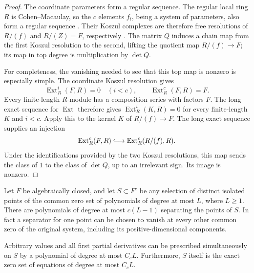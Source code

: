 \begin{proof}
The coordinate parameters form a regular sequence.  The regular local
ring $R$ is Cohen--Macaulay, so the $c$ elements $f_i$, being a system of
parameters, also form a regular sequence
\cite[Tags~00OQ, 00NQ, and 02JN]{stacksproject}.  Their Koszul complexes
are therefore free resolutions of $R/(f)$ and $R/(Z)=F$, respectively
\cite[Tag~062F]{stacksproject}.
The matrix $Q$ induces a chain map from the first Koszul resolution to
the second, lifting the quotient map $R/(f)\longrightarrow F$; its map
in top degree is multiplication by $\det Q$.

For completeness, the vanishing needed to see that this top map is
nonzero is especially simple.  The coordinate Koszul resolution gives
\[
 \operatorname{Ext}^i_R(F,R)=0\quad(i<c),\qquad
 \operatorname{Ext}^c_R(F,R)=F.
\]
Every finite-length $R$-module has a composition series with factors
$F$.  The long exact sequence for $\operatorname{Ext}$ therefore gives
$\operatorname{Ext}^i_R(K,R)=0$ for every finite-length $K$ and $i<c$.
Apply this to the kernel $K$ of $R/(f)\longrightarrow F$.  The long exact
sequence supplies an injection
\[
 \operatorname{Ext}^c_R(F,R)\lhook\joinrel\longrightarrow
       \operatorname{Ext}^c_R(R/(f),R).
\]
Under the identifications provided by the two Koszul resolutions, this
map sends the class of $1$ to the class of $\det Q$, up to an irrelevant
sign.  Its image is nonzero.
\end{proof}

\begin{lemma}
\label{poly:interpolation}
Let $F$ be algebraically closed, and let $S\subset F^c$ be any selection
of distinct isolated points of the common zero set of polynomials of
degree at most $L$, where $L\ge1$.  There are polynomials of degree at
most $c(L-1)$ separating the points of $S$.  In fact a separator for one
point can be chosen to vanish at every other common zero of the original
system, including its positive-dimensional components.

Arbitrary values and all first partial derivatives can be prescribed
simultaneously on $S$ by a polynomial of degree at most $C_cL$.
Furthermore, $S$ itself is the exact zero set of equations of degree at
most $C_cL$.
\end{lemma}

